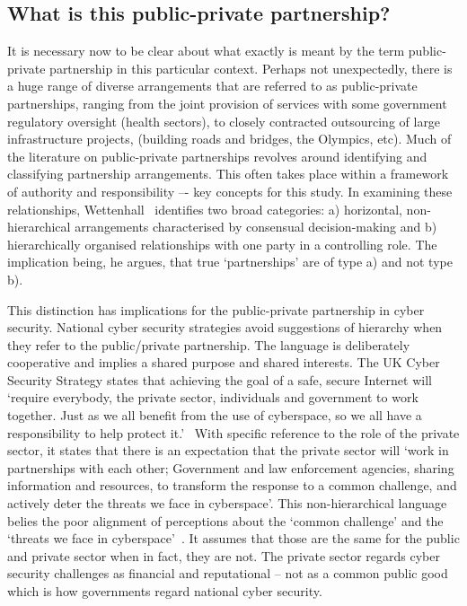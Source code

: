 \documentclass[a4paper,11pt]{article}
\begin{document}
\subsection{What is this public-private partnership?}

It is necessary now to be clear about what exactly is meant by the
term public-private partnership in this particular context. Perhaps
not unexpectedly, there is a huge range of diverse arrangements that
are referred to as public-private partnerships, ranging from the joint
provision of services with some government regulatory oversight
(health sectors), to closely contracted outsourcing of large
infrastructure projects, (building roads and bridges, the Olympics,
etc). Much of the literature on public-private partnerships revolves
around identifying and classifying partnership arrangements. This
often takes place within a framework of authority and responsibility
–- key concepts for this study. In examining these relationships,
Wettenhall~\cite{wettenhall:2003} identifies two broad categories: a)
horizontal, non-hierarchical arrangements characterised by consensual
decision-making and b) hierarchically organised relationships with one
party in a controlling role. The implication being, he argues, that
true `partnerships' are of type a) and not type b).

This distinction has implications for the public-private partnership
in cyber security. National cyber security strategies avoid
suggestions of hierarchy when they refer to the public/private
partnership. The language is deliberately cooperative and implies a
shared purpose and shared interests. The UK Cyber Security Strategy
states that achieving the goal of a safe, secure Internet will
`require everybody, the private sector, individuals and government to
work together. Just as we all benefit from the use of cyberspace, so
we all have a responsibility to help protect
it.'~\cite{ukcss:2011,ukcss:2013} With specific reference to the role
of the private sector, it states that there is an expectation that the
private sector will `work in partnerships with each other; Government
and law enforcement agencies, sharing information and resources, to
transform the response to a common challenge, and actively deter the
threats we face in cyberspace'.  This non-hierarchical language belies
the poor alignment of perceptions about the `common challenge' and the
`threats we face in cyberspace'~\cite{ukcss:2011,ukcss:2013}. It
assumes that those are the same for the public and private sector when
in fact, they are not. The private sector regards cyber security
challenges as financial and reputational -- not as a common public
good which is how governments regard national cyber security.
\end{document}
